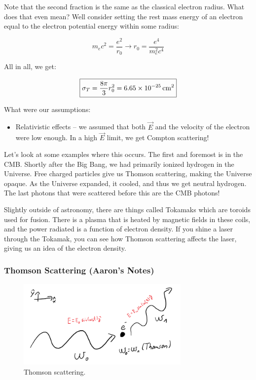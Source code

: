 \documentclass{article}
\newcommand{\unit}[1]{{\,\rm #1}}
\newcommand{\cm}{\unit{cm}}
\def\Efield{{\vec {E}}}
\begin{document}
Note that the second fraction is the same as the classical electron radius. What does that even mean? Well consider setting the rest mass energy of an electron equal to the electron potential energy within some radius:

$$
m_e c^2 = \frac{e^2}{r_0 }\rightarrow r_0 = \frac{e^4}{m_e^2 c^4}
$$

All in all, we get:

$$
\boxed{\sigma_T = \frac{8\pi}{3} r_0^2 = 6.65 \times 10^{-25} \cm^{2}}
$$

What were our assumptions:
\begin{itemize}
    \item Relativistic effects -- we assumed that both $\Efield$ and the velocity of the electron were low enough. In a high $\vec{E}$ limit, we get Compton scattering! 
\end{itemize}

Let's look at some examples where this occurs. The first and foremost is in the CMB. Shortly after the Big Bang, we had primarily ionized hydrogen in the Universe. Free charged particles give us Thomson scattering, making the Universe opaque. As the Universe expanded, it cooled, and thus we get neutral hydrogen. The last photons that were scattered before this are the CMB photons! 

Slightly outside of astronomy, there are things called Tokamaks which are toroids used for fusion. There is a plasma that is heated by magnetic fields in these coils, and the power radiated is a function of electron density. If you shine a laser through the Tokamak, you can see how Thomson scattering affects the laser, giving us an idea of the electron density. 

\subsubsection{Thomson Scattering (Aaron's Notes)}

\begin{figure}
    \centering
    \includegraphics[width=0.75\textwidth]{figures/800px-Thomson.png}
    \caption{Thomson scattering.}
    \label{fig:thomson}
\end{figure}
\end{document}

